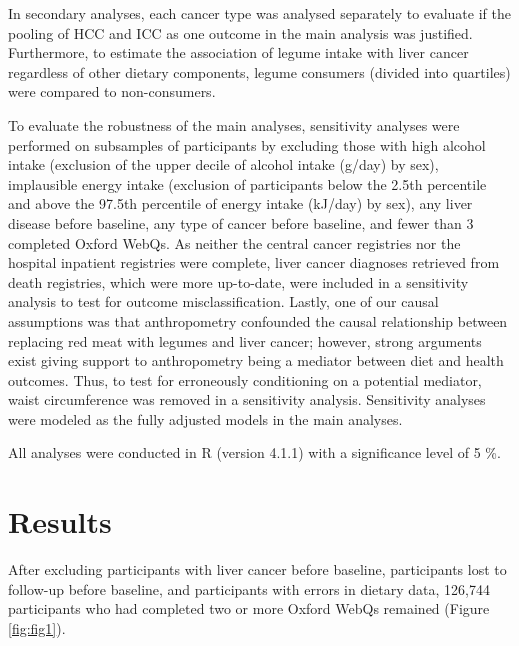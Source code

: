 \documentclass[nutrients,article,submit,moreauthors,pdftex]{Definitions/mdpi}
\begin{document}
In secondary analyses, each cancer type was analysed separately to
evaluate if the pooling of HCC and ICC as one outcome in the main
analysis was justified. Furthermore, to estimate the association of
legume intake with liver cancer regardless of other dietary components,
legume consumers (divided into quartiles) were compared to
non-consumers.

To evaluate the robustness of the main analyses, sensitivity analyses
were performed on subsamples of participants by excluding those with
high alcohol intake (exclusion of the upper decile of alcohol intake
(g/day) by sex), implausible energy intake (exclusion of participants
below the 2.5th percentile and above the 97.5th percentile of energy
intake (kJ/day) by sex), any liver disease before baseline, any type of
cancer before baseline, and fewer than 3 completed Oxford WebQs. As
neither the central cancer registries nor the hospital inpatient
registries were complete, liver cancer diagnoses retrieved from death
registries, which were more up-to-date, were included in a sensitivity
analysis to test for outcome misclassification. Lastly, one of our
causal assumptions was that anthropometry confounded the causal
relationship between replacing red meat with legumes and liver cancer;
however, strong arguments exist giving support to anthropometry being a
mediator between diet and health outcomes. Thus, to test for erroneously
conditioning on a potential mediator, waist circumference was removed in
a sensitivity analysis. Sensitivity analyses were modeled as the fully
adjusted models in the main analyses.

All analyses were conducted in R (version 4.1.1) with a significance
level of 5 \%.

\hypertarget{sec3}{%
\section{Results}\label{sec3}}

After excluding participants with liver cancer before baseline,
participants lost to follow-up before baseline, and participants with
errors in dietary data, 126,744 participants who had completed two or
more Oxford WebQs remained (Figure \ref{fig:fig1}).
\end{document}
